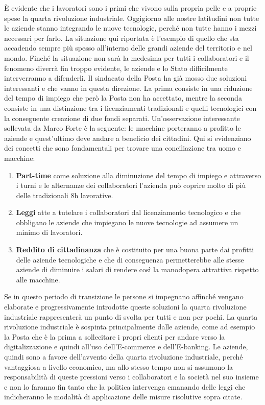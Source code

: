 È evidente che i lavoratori sono i primi che vivono sulla propria pelle e a proprie spese la quarta rivoluzione industriale. Oggigiorno alle nostre latitudini non tutte le aziende stanno integrando le nuove tecnologie, perché non tutte hanno i mezzi necessari per farlo. La situazione qui riportata è l’esempio di quello che sta accadendo sempre più spesso all’interno delle grandi aziende del territorio e nel mondo. Finché la situazione non sarà la medesima per tutti i collaboratori e il fenomeno diverrà fin troppo evidente, le aziende e lo Stato difficilmente interverranno a difenderli. Il sindacato della Posta ha già mosso due soluzioni interessanti e che vanno in questa direzione. La prima consiste in una riduzione del tempo di impiego che però la Posta non ha accettato, mentre la seconda consiste in una distinzione tra i licenziamenti tradizionali e quelli tecnologici con la conseguente creazione di due fondi separati. Un’osservazione interessante sollevata da Marco Forte è la seguente: le macchine porteranno a profitto le aziende e quest’ultimo deve andare a beneficio dei cittadini. Qui si evidenziano dei concetti che sono fondamentali per trovare una conciliazione tra uomo e macchine:
\begin{enumerate}
    \item \textbf{Part-time} come soluzione alla diminuzione del tempo di impiego e attraverso i turni e le alternanze dei collaboratori l’azienda può coprire molto di più delle tradizionali 8h lavorative.
    \item \textbf{Leggi} atte a tutelare i collaboratori dal licenziamento tecnologico e che obbligano le aziende che impiegano le nuove tecnologie ad assumere un minimo di lavoratori.
    \item \textbf{Reddito di cittadinanza} che è costituito per una buona parte dai profitti delle aziende tecnologiche e che di conseguenza permetterebbe alle stesse aziende di diminuire i salari di rendere così la manodopera attrattiva rispetto alle macchine.
\end{enumerate}
Se in questo periodo di transizione le persone si impegnano affinché vengano elaborate e progressivamente introdotte queste soluzioni la quarta rivoluzione industriale rappresenterà un punto di svolta per tutti e non per pochi.
La quarta rivoluzione industriale è sospinta principalmente dalle aziende, come ad esempio la Posta che è la prima a sollecitare i propri clienti per andare verso la digitalizzazione e quindi all’uso dell’E-commerce e dell’E-banking. Le aziende, quindi sono a favore dell’avvento della quarta rivoluzione industriale, perché vantaggiosa a livello economico, ma allo stesso tempo non si assumono la responsabilità di queste pressioni verso i collaboratori e la società nel suo insieme e non lo faranno fin tanto che la politica intervenga emanando delle leggi che indicheranno le modalità di applicazione delle misure risolutive sopra citate.  
